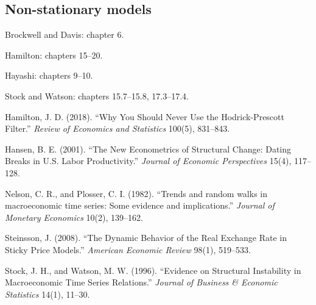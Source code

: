 \documentclass[12pt]{article}
\begin{document}
\subsection{Non-stationary models}
\begin{description}
\item Brockwell and Davis: chapter 6.
\item Hamilton: chapters 15--20.
\item Hayashi: chapters 9--10.
\item[*] Stock and Watson: chapters 15.7--15.8, 17.3--17.4.
\item Hamilton, J. D. (2018). ``Why You Should Never Use the Hodrick-Prescott Filter.'' \emph{Review of Economics and Statistics} 100(5), 831--843.
\item[*] Hansen, B. E. (2001). ``The New Econometrics of Structural Change: Dating Breaks in U.S. Labor Productivity.'' \emph{Journal of Economic Perspectives} 15(4), 117--128.
\item Nelson, C. R., and Plosser, C. I. (1982). ``Trends and random walks in macroeconomic time series: Some evidence and implications.'' \emph{Journal of Monetary Economics} 10(2), 139--162.
\item Steinsson, J. (2008). ``The Dynamic Behavior of the Real Exchange Rate in Sticky Price Models.'' \emph{American Economic Review} 98(1), 519--533.
\item Stock, J. H., and Watson, M. W. (1996). ``Evidence on Structural Instability in Macroeconomic Time Series Relations.'' \emph{Journal of Business \& Economic Statistics} 14(1), 11--30.
\end{description}
\end{document}
